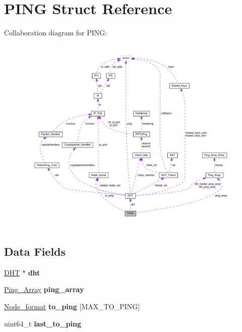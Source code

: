 \hypertarget{struct_p_i_n_g}{\section{P\+I\+N\+G Struct Reference}
\label{struct_p_i_n_g}
}


Collaboration diagram for P\+I\+N\+G\+:
\nopagebreak
\begin{figure}[H]
\begin{center}
\leavevmode
\includegraphics[width=350pt]{struct_p_i_n_g__coll__graph}
\end{center}
\end{figure}
\subsection*{Data Fields}
\begin{DoxyCompactItemize}
\item 
\hypertarget{struct_p_i_n_g_a8b3d6ce8745acc52695e252bdb1531b6}{\hyperlink{struct_d_h_t}{D\+H\+T} $\ast$ {\bfseries dht}}\label{struct_p_i_n_g_a8b3d6ce8745acc52695e252bdb1531b6}

\item 
\hypertarget{struct_p_i_n_g_afb64d37a183969be553d23416dc47a4b}{\hyperlink{struct_ping___array}{Ping\+\_\+\+Array} {\bfseries ping\+\_\+array}}\label{struct_p_i_n_g_afb64d37a183969be553d23416dc47a4b}

\item 
\hypertarget{struct_p_i_n_g_a285072fd4cc519802afa28bef4227c57}{\hyperlink{struct_node__format}{Node\+\_\+format} {\bfseries to\+\_\+ping} \mbox{[}M\+A\+X\+\_\+\+T\+O\+\_\+\+P\+I\+N\+G\mbox{]}}\label{struct_p_i_n_g_a285072fd4cc519802afa28bef4227c57}

\item 
\hypertarget{struct_p_i_n_g_afc22124d671081ed5b12fc2fa71801d3}{uint64\+\_\+t {\bfseries last\+\_\+to\+\_\+ping}}\label{struct_p_i_n_g_afc22124d671081ed5b12fc2fa71801d3}

\end{DoxyCompactItemize}


